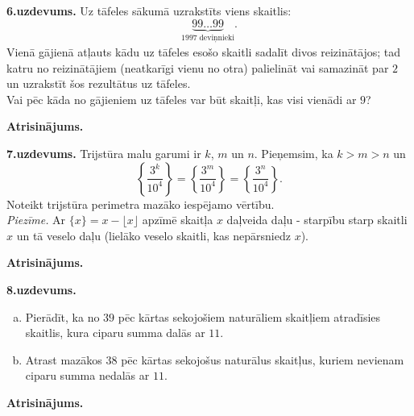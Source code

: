 \documentclass[11pt]{article}
\begin{document}
\vspace{10pt}
{\footnotesize
{\bf 6.uzdevums.}
Uz tāfeles sākumā uzrakstīts viens skaitlis: 
$$\underbrace{99\ldots{}99}_{1997\;\text{deviņnieki}}.$$
Vienā gājienā atļauts kādu uz tāfeles esošo skaitli sadalīt 
divos reizinātājos; tad katru no reizinātājiem (neatkarīgi vienu no otra) 
palielināt vai samazināt par $2$ un uzrakstīt šos rezultātus uz tāfeles.\\
Vai pēc kāda no gājieniem uz tāfeles var būt skaitļi, kas visi vienādi ar $9$?
}


\vspace{6pt}
{\bf Atrisinājums.} 



\vspace{10pt}
{\footnotesize
{\bf 7.uzdevums.}
Trijstūra malu garumi ir $k$, $m$ un $n$. Pieņemsim, ka $k > m > n$ un 
$$\left\{ \frac{3^k}{10^4} \right\} = \left\{ \frac{3^m}{10^4} \right\} = \left\{ \frac{3^n}{10^4} \right\}.$$
Noteikt trijstūra perimetra mazāko iespējamo vērtību.\\ 
{\em Piezīme.} Ar $\{ x \} = x - \lfloor x \rfloor$ apzīmē skaitļa $x$ daļveida daļu - 
starpību starp skaitli $x$ un tā veselo daļu (lielāko veselo 
skaitli, kas nepārsniedz $x$).
}


\vspace{6pt}
{\bf Atrisinājums.} 


\vspace{10pt}
{\footnotesize
{\bf 8.uzdevums.}
\begin{enumerate}[(a)]
\item Pierādīt, ka no $39$ pēc kārtas sekojošiem naturāliem skaitļiem atradīsies skaitlis, 
kura ciparu summa dalās ar $11$.
\item Atrast mazākos $38$ pēc kārtas sekojošus naturālus skaitļus, kuriem nevienam 
ciparu summa nedalās ar $11$.
\end{enumerate}
}


\vspace{6pt}
{\bf Atrisinājums.} 
\end{document}
